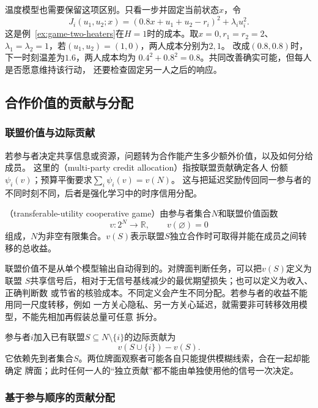 温度模型也需要保留这项区别。只看一步并固定当前状态\(x\)，令
\[
  J_i(u_1,u_2;x)
  =(0.8x+u_1+u_2-r_i)^2+\lambda_i u_i^2.
\]
这是例~\ref{ex:game-two-heaters}在\(H=1\)时的成本。取\(x=0,r_1=r_2=2\)、
\(\lambda_1=\lambda_2=1\)，若\((u_1,u_2)=(1,0)\)，两人成本分别为\(2,1\)。
改成\((0.8,0.8)\)时，下一时刻温差为\(1.6\)，两人成本均为
\(0.4^2+0.8^2=0.8\)。共同改善确实可能，但每人是否愿意维持该行动，
还要检查固定另一人之后的响应。

\subsection{合作价值的贡献与分配}
\label{sec:game-credit-allocation-multiparty-payoffs}

\subsubsection{联盟价值与边际贡献}
\label{sec:game-coalition-value}

若参与者决定共享信息或资源，问题转为合作能产生多少额外价值，以及如何分给成员。
这里的（multi-party credit allocation）指按联盟贡献确定各人
份额\(\psi_i(v)\)；预算平衡要求\(\sum_i\psi_i(v)=v(N)\)。
这与把延迟奖励传回同一参与者的不同时刻不同，后者是强化学习中的时序信用分配。
\begin{definition}[可转移效用博弈]
\label{def:game-transferable-utility-cooperation}
（transferable-utility cooperative game）由参与者集合\(N\)和联盟价值函数
\[
  v:2^N\to\mathbb{R},\qquad v(\varnothing)=0
\]
组成，$N$为非空有限集合。\(v(S)\)表示联盟\(S\)独立合作时可取得并能在成员之间转移的总收益。
\end{definition}

联盟价值不是从单个模型输出自动得到的。对牌面判断任务，可以把\(v(S)\)定义为联盟
\(S\)共享信号后，相对于无信号基线减少的最优期望损失；也可以定义为收入、正确判断数
或节省的核验成本。不同定义会产生不同分配。若参与者的收益不能用同一尺度转移，例如
一方关心隐私、另一方关心延迟，就需要非可转移效用模型，不能先相加再假装总量可任意
拆分。

参与者\(i\)加入已有联盟\(S\subseteq N\setminus\{i\}\)的边际贡献为
\[
  v(S\cup\{i\})-v(S).
\]
它依赖先到者集合\(S\)。两位牌面观察者可能各自只能提供模糊线索，合在一起却能确定
牌面；此时任何一人的“独立贡献”都不能由单独使用他的信号一次决定。

\subsubsection{基于参与顺序的贡献分配}
\label{sec:game-shapley-order}

